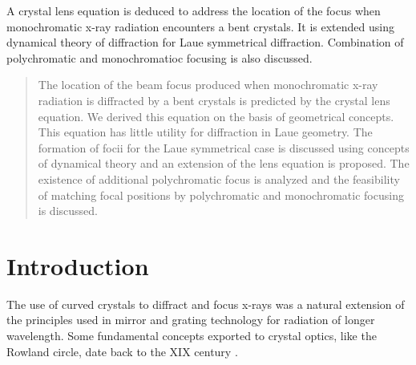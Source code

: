\documentclass[preprint]{iucr}              %
\begin{document}
\maketitle                        %

\begin{synopsis}
A crystal lens equation is deduced to address the location of the focus when monochromatic x-ray radiation encounters a bent crystals. It is extended using dynamical theory of diffraction for Laue symmetrical diffraction. Combination of polychromatic and monochromatioc focusing is also discussed. 
\end{synopsis}

\begin{abstract}
The location of the beam focus produced when monochromatic x-ray radiation is diffracted by a bent crystals is predicted by the crystal lens equation. We derived this equation on the basis of geometrical concepts. This equation has little utility for diffraction in Laue geometry. The formation of focii for the Laue symmetrical case is discussed using concepts of dynamical theory and an extension of the lens equation is proposed. The existence of additional polychromatic focus is analyzed and the feasibility of matching focal positions by polychromatic and monochromatic focusing is discussed.   
\end{abstract}



\section{Introduction}

The use of curved crystals to diffract and focus x-rays was a natural extension of the principles used in mirror and grating technology for radiation of longer wavelength. Some fundamental concepts exported to crystal optics, like the Rowland circle, date back to the XIX century \cite{rowland1882}.
\end{document}

